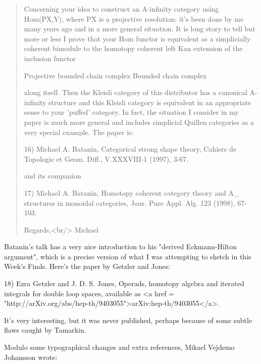 \begin{quote}
   Concerning your idea to construct an A-infinity category using 
   Hom(PX,Y), where PX is a projective resolution: it's been done by 
   me many years ago and in a more general situation.  It is long story 
   to tell but more or less I prove that your Hom functor is equivalent 
   as a simplicially coherent bimodule to the homotopy coherent left 
   Kan extension of the inclusion functor 

   Projective bounded chain complex \to  Bounded chain complex 

   along itself.  Then the Kleisli category of this distributor has a 
   canonical A-infinity structure and this Kleisli category is equivalent 
   in an appropriate sense to your 'puffed' category.  In fact, the 
   situation I consider in my paper is much more general and includes 
   simplicial Quillen categories as a very special example.  The paper is:

   16) Michael A. Batanin, Categorical strong shape theory, Cahiers de 
   Topologie et Geom. Diff., V.XXXVIII-1 (1997), 3-67. 

   and its companion 

   17) Michael A. Batanin, Homotopy coherent category theory and 
   A_{\infty } structures in monoidal categories, Jour. Pure Appl. 
   Alg. 123 (1998), 67-103.

  Regards,<br/>
  Michael 
\end{quote}

Batanin's talk has a very nice introduction to his "derived 
Eckmann-Hilton argument", which is a precise version of what I was 
attempting to sketch in this Week's Finds.  Here's the paper by
Getzler and Jones:

18) Ezra Getzler and J. D. S. Jones, Operads, homotopy algebra and 
iterated integrals for double loop spaces, available as 
<a href = "http://arXiv.org/abs/hep-th/9403055">arXiv:hep-th/9403055</a>.

It's very interesting, but it was never published, perhaps because 
of some subtle flaws caught by Tamarkin. 

Modulo some typographical changes and extra references, Mikael Vejdemo
Johansson wrote:

